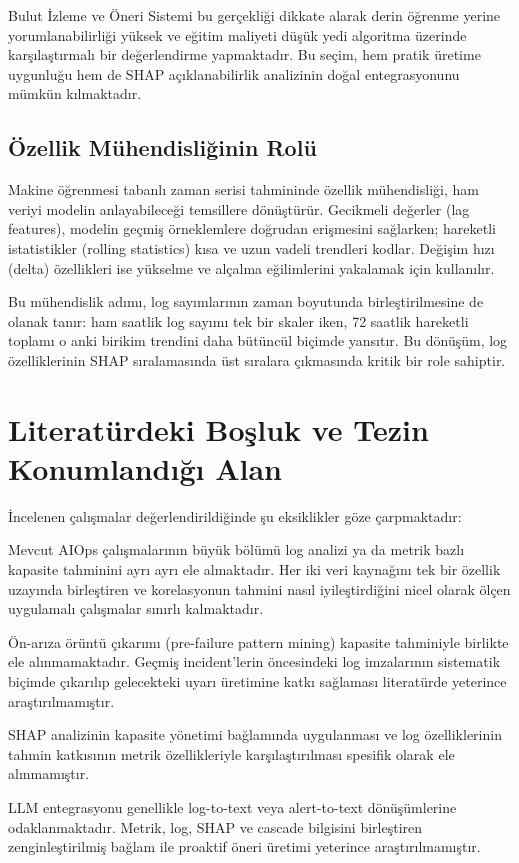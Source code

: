 Bulut İzleme ve Öneri Sistemi bu gerçekliği dikkate alarak derin öğrenme yerine yorumlanabilirliği yüksek ve eğitim maliyeti düşük yedi algoritma üzerinde karşılaştırmalı bir değerlendirme yapmaktadır.
Bu seçim, hem pratik üretime uygunluğu hem de SHAP açıklanabilirlik analizinin doğal entegrasyonunu mümkün kılmaktadır.

\subsection{Özellik Mühendisliğinin Rolü}

Makine öğrenmesi tabanlı zaman serisi tahmininde özellik mühendisliği, ham veriyi modelin anlayabileceği temsillere dönüştürür.
Gecikmeli değerler (lag features), modelin geçmiş örneklemlere doğrudan erişmesini sağlarken; hareketli istatistikler (rolling statistics) kısa ve uzun vadeli trendleri kodlar.
Değişim hızı (delta) özellikleri ise yükselme ve alçalma eğilimlerini yakalamak için kullanılır.

Bu mühendislik adımı, log sayımlarının zaman boyutunda birleştirilmesine de olanak tanır: ham saatlik log sayımı tek bir skaler iken, 72 saatlik hareketli toplamı o anki birikim trendini daha bütüncül biçimde yansıtır.
Bu dönüşüm, log özelliklerinin SHAP sıralamasında üst sıralara çıkmasında kritik bir role sahiptir.


\section{Literatürdeki Boşluk ve Tezin Konumlandığı Alan}

İncelenen çalışmalar değerlendirildiğinde şu eksiklikler göze çarpmaktadır:

\begin{maddelendir}[label=\arabic*.]
    \item Mevcut AIOps çalışmalarının büyük bölümü log analizi ya da metrik bazlı kapasite tahminini ayrı ayrı ele almaktadır.
    Her iki veri kaynağını tek bir özellik uzayında birleştiren ve korelasyonun tahmini nasıl iyileştirdiğini nicel olarak ölçen uygulamalı çalışmalar sınırlı kalmaktadır.

    \item Ön-arıza örüntü çıkarımı (pre-failure pattern mining) kapasite tahminiyle birlikte ele alınmamaktadır.
    Geçmiş incident'lerin öncesindeki log imzalarının sistematik biçimde çıkarılıp gelecekteki uyarı üretimine katkı sağlaması literatürde yeterince araştırılmamıştır.

    \item SHAP analizinin kapasite yönetimi bağlamında uygulanması ve log özelliklerinin tahmin katkısının metrik özellikleriyle karşılaştırılması spesifik olarak ele alınmamıştır.

    \item LLM entegrasyonu genellikle log-to-text veya alert-to-text dönüşümlerine odaklanmaktadır.
    Metrik, log, SHAP ve cascade bilgisini birleştiren zenginleştirilmiş bağlam ile proaktif öneri üretimi yeterince araştırılmamıştır.
\end{maddelendir}

